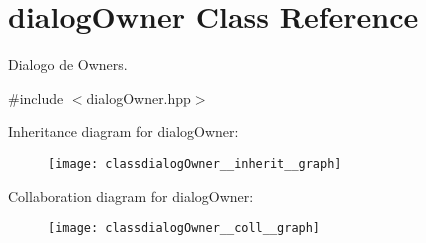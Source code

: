 \hypertarget{classdialogOwner}{}\section{dialog\+Owner Class Reference}
\label{classdialogOwner}


Dialogo de Owners.  




{\ttfamily \#include $<$dialog\+Owner.\+hpp$>$}



Inheritance diagram for dialog\+Owner\+:
\nopagebreak
\begin{figure}[H]
\begin{center}
\leavevmode
\texttt{[image: classdialogOwner\_\_inherit\_\_graph]}
\end{center}
\end{figure}


Collaboration diagram for dialog\+Owner\+:
\nopagebreak
\begin{figure}[H]
\begin{center}
\leavevmode
\texttt{[image: classdialogOwner\_\_coll\_\_graph]}
\end{center}
\end{figure}
